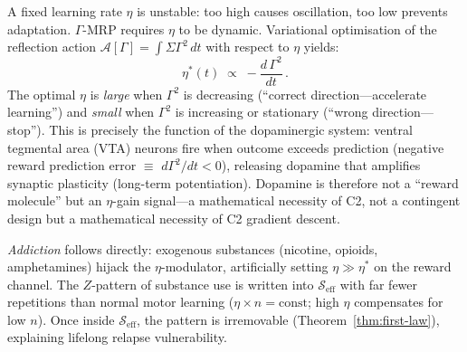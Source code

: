 \documentclass[aps,pre,twocolumn,superscriptaddress,floatfix]{revtex4-2}
\begin{document}
\begin{remark}
\label{rem:dopamine-eta}
A fixed learning rate $\eta$ is unstable:
too high causes oscillation, too low prevents adaptation.
$\Gamma$-MRP requires $\eta$ to be dynamic.
Variational optimisation of the reflection action
$\mathcal{A}[\Gamma] = \int \Sigma\Gamma^2\,dt$ with
respect to $\eta$ yields:
\begin{equation}
  \eta^*(t) \;\propto\; -\frac{d\,\Gamma^2}{dt}\,.
  \label{eq:eta-optimal}
\end{equation}
The optimal $\eta$ is \emph{large} when $\Gamma^2$ is
decreasing (``correct direction---accelerate learning'')
and \emph{small} when $\Gamma^2$ is increasing or
stationary (``wrong direction---stop'').
This is precisely the function of the dopaminergic
system: ventral tegmental area (VTA) neurons fire when
outcome exceeds prediction (negative reward prediction
error $\equiv$ $d\Gamma^2/dt < 0$), releasing dopamine
that amplifies synaptic plasticity (long-term
potentiation).
Dopamine is therefore not a ``reward molecule'' but an
$\eta$-gain signal---a mathematical necessity of C2,
not a contingent design but a mathematical necessity of C2
gradient descent.

\emph{Addiction} follows directly: exogenous substances
(nicotine, opioids, amphetamines) hijack the
$\eta$-modulator, artificially setting $\eta \gg \eta^*$
on the reward channel.
The $Z$-pattern of substance use is written into
$\mathcal{S}_{\text{eff}}$ with far fewer repetitions
than normal motor learning ($\eta \times n = \text{const}$;
high $\eta$ compensates for low $n$).
Once inside $\mathcal{S}_{\text{eff}}$, the pattern is
irremovable (Theorem~\ref{thm:first-law}), explaining
lifelong relapse vulnerability.
\end{remark}
\end{document}
